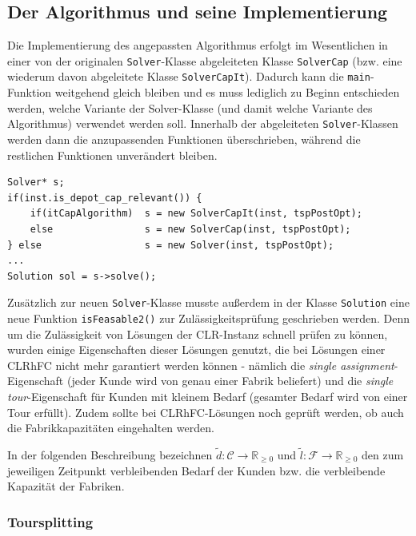 \documentclass[a4paper,ngerman,11pt,bibtotoc]{scrartcl}
\theoremstyle{definition}
\theoremstyle{plain}
\theoremstyle{remark}
\newcommand{\IR}{\mathbb{R}}
\newcommand{\ClientSet}{\mathscr{C}}
\newcommand{\FacilitySet}{\mathscr{F}}
\newcommand{\CLR}{CLR}
\newcommand{\CLRHFC}{CLRhFC}
\begin{document}
	\subsection{Der Algorithmus und seine Implementierung}
	
	Die Implementierung des angepassten Algorithmus erfolgt im Wesentlichen in einer von der originalen \lstinline|Solver|-Klasse abgeleiteten Klasse \lstinline|SolverCap| (bzw. eine wiederum davon abgeleitete Klasse \lstinline|SolverCapIt|). Dadurch kann die \lstinline|main|-Funktion weitgehend gleich bleiben und es muss lediglich zu Beginn entschieden werden, welche Variante der Solver-Klasse (und damit welche Variante des Algorithmus) verwendet werden soll. Innerhalb der abgeleiteten \lstinline|Solver|-Klassen werden dann die anzupassenden Funktionen überschrieben, während die restlichen Funktionen unverändert bleiben.
	
	\begin{lstlisting}[caption=Zu Beginn der \lstinline|main|-Funktion wird entschieden welcher Solver verwendet wird. Der weitere Ablauf des Programms kann unabhängig davon beschrieben werden.]
Solver* s;
if(inst.is_depot_cap_relevant()) {
	if(itCapAlgorithm) 	s = new SolverCapIt(inst, tspPostOpt);
	else 				s = new SolverCap(inst, tspPostOpt);
} else 					s = new Solver(inst, tspPostOpt);
...
Solution sol = s->solve();
	\end{lstlisting}
	
	Zusätzlich zur neuen \lstinline|Solver|-Klasse musste außerdem in der Klasse \lstinline|Solution| eine neue Funktion  \lstinline|isFeasable2()| zur Zulässigkeitsprüfung geschrieben werden. Denn um die Zulässigkeit von Lösungen der \CLR-Instanz schnell prüfen zu können, wurden einige Eigenschaften dieser Lösungen genutzt, die bei Lösungen einer \CLRHFC{} nicht mehr garantiert werden können - nämlich die \emph{single assignment}-Eigenschaft (jeder Kunde wird von genau einer Fabrik beliefert) und die \emph{single tour}-Eigenschaft für Kunden mit kleinem Bedarf (gesamter Bedarf wird von einer Tour erfüllt). Zudem sollte bei \CLRHFC-Lösungen noch geprüft werden, ob auch die Fabrikkapazitäten eingehalten werden.
	
	In der folgenden Beschreibung bezeichnen $\tilde{d}: \ClientSet \to \IR_{\geq 0}$ und $\tilde{l}: \FacilitySet \to \IR_{\geq 0}$ den zum jeweiligen Zeitpunkt verbleibenden Bedarf der Kunden bzw. die verbleibende Kapazität der Fabriken.
	

	\subsubsection{Toursplitting}
	
\end{document}
